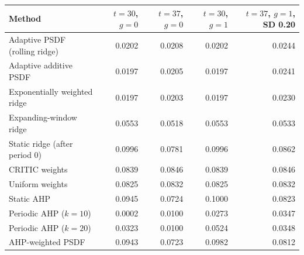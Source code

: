 \begin{tabular}{lrrrr}
\toprule
Method & $t=30$, $g=0$ & $t=37$, $g=0$ & $t=30$, $g=1$ & $t=37$, $g=1$, SD 0.20 \\
\midrule
Adaptive PSDF (rolling ridge) & 0.0202 & 0.0208 & 0.0202 & 0.0244 \\
Adaptive additive PSDF & 0.0197 & 0.0205 & 0.0197 & 0.0241 \\
Exponentially weighted ridge & 0.0197 & 0.0203 & 0.0197 & 0.0230 \\
Expanding-window ridge & 0.0553 & 0.0518 & 0.0553 & 0.0533 \\
Static ridge (after period 0) & 0.0996 & 0.0781 & 0.0996 & 0.0862 \\
CRITIC weights & 0.0839 & 0.0846 & 0.0839 & 0.0846 \\
Uniform weights & 0.0825 & 0.0832 & 0.0825 & 0.0832 \\
Static AHP & 0.0945 & 0.0724 & 0.1000 & 0.0823 \\
Periodic AHP ($k=10$) & 0.0002 & 0.0100 & 0.0273 & 0.0347 \\
Periodic AHP ($k=20$) & 0.0323 & 0.0100 & 0.0524 & 0.0348 \\
AHP-weighted PSDF & 0.0943 & 0.0723 & 0.0982 & 0.0812 \\
\bottomrule
\end{tabular}
